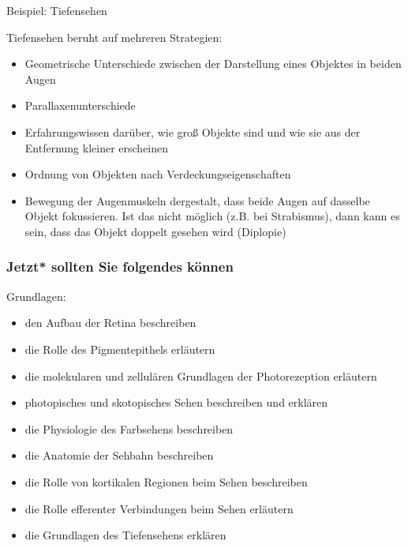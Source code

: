 \documentclass{beamer}
\begin{document}
\begin{frame}{Beispiel: Tiefensehen}

Tiefensehen beruht auf mehreren Strategien:

\begin{itemize}
    \item 
    Geometrische Unterschiede zwischen der Darstellung eines Objektes in beiden Augen
    \item
    Parallaxenunterschiede
    \item
    Erfahrungswissen darüber, wie groß Objekte sind und wie sie aus der Entfernung kleiner erscheinen
    \item
    Ordnung von Objekten nach Verdeckungseigenschaften
    \item
    Bewegung der Augenmuskeln dergestalt, dass beide Augen auf dasselbe Objekt fokussieren. Ist das nicht möglich (z.B. bei Strabismus), dann kann es sein, dass das Objekt doppelt gesehen wird (Diplopie)
\end{itemize}



\end{frame}








\begin{frame}

 \frametitle{Jetzt* sollten Sie folgendes können}



\begin{block}{Grundlagen:}




\begin{itemize}

    \item 
den Aufbau der Retina beschreiben
    \item 
die Rolle des Pigmentepithels erläutern
    \item 
die molekularen und zellulären Grundlagen der Photorezeption erläutern
    \item 
photopisches und skotopisches Sehen beschreiben und erklären
    \item 
die Physiologie des Farbsehens beschreiben
    \item 
die Anatomie der Sehbahn beschreiben
    \item 
die Rolle von kortikalen Regionen beim Sehen beschreiben
    \item 
die Rolle efferenter Verbindungen beim Sehen erläutern
    \item 
die Grundlagen des Tiefensehens erklären
\end{itemize}


\end{block}

\end{frame}
\end{document}
